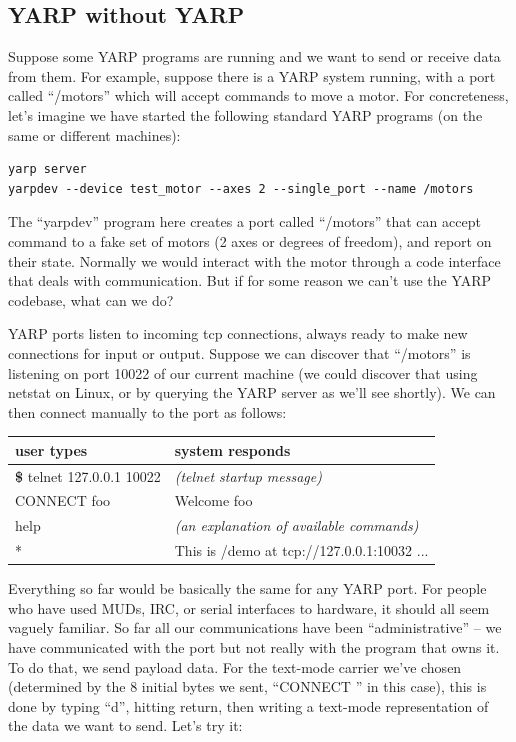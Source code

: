 \subsection{YARP without YARP}

Suppose some YARP programs are running and we want to send or
receive data from them.
%
For example, suppose there is a YARP system running, with a 
port called ``/motors'' which will accept commands to move a
motor.  For concreteness, let's imagine we have started the
following standard YARP programs (on the same or different 
machines):

\begin{verbatim}
yarp server
yarpdev --device test_motor --axes 2 --single_port --name /motors
\end{verbatim}

The ``yarpdev'' program here creates a port called ``/motors'' that can
accept command to a fake set of motors (2 axes or degrees of freedom),
and report on their state.
%
Normally we would interact with the motor through a code
interface that deals with communication.  But if for 
some reason we can't use the YARP codebase, what can
we do?

YARP ports listen to incoming tcp connections, always ready to make
new connections for input or output.  Suppose we can discover that
``/motors'' is listening on port 10022 of our current machine (we could
discover that using netstat on Linux, or by querying the YARP server
as we'll see shortly).
%
We can then connect manually to the port as follows:

\begin{center}
\begin{tabular}{ll}
\hline\hline
{\bf user types} & {\bf system responds} \\
\hline
{\bf \$} telnet 127.0.0.1 10022 & {\it (telnet startup message)} \\
CONNECT foo & Welcome foo \\
help & {\it (an explanation of available commands)} \\
* & This is /demo at tcp://127.0.0.1:10032 ... \\
\hline\hline
\end{tabular}
\end{center}

Everything so far would be basically the same for any YARP port.
For people who have used MUDs, IRC, or serial interfaces to hardware,
it should all seem vaguely familiar.
%
So far all our communications have been ``administrative'' --
we have communicated with the port but not really with the 
program that owns it.  To do that, we send payload data.  For the
text-mode carrier we've chosen (determined by the 8 initial
bytes we sent, ``CONNECT '' in this case), this is done by typing
``d'', hitting return, then writing a text-mode representation of
the data we want to send.  Let's try it:

